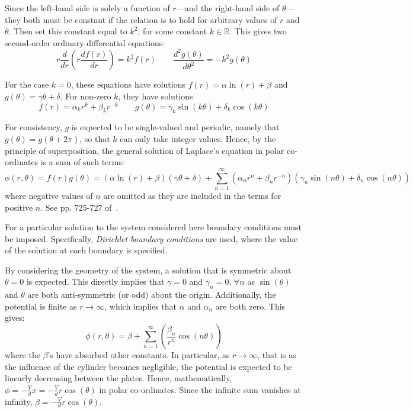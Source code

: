 \documentclass[11pt, a4paper]{article}
\newcommand{\be}{\begin{equation}}
\newcommand{\ee}{\end{equation}}
\begin{document}
Since the left-hand side is solely a function of $r$---and the right-hand side of
$\theta$---they both must be constant if the relation is to hold for arbitrary values
of $r$ and $\theta$. Then set this constant equal to $k^2$, for some constant
$k\in\mathbb{R}$. This gives two second-order ordinary differential equations:
%
\be
r\frac{d}{dr}(r \frac{df(r)}{dr}) = k^2 f(r) \qquad
\frac{d^2 g(\theta)}{d\theta^2}=-k^2 g(\theta)
\ee

For the case $k=0$, these equations have solutions
$f(r)=\alpha \ln(r) + \beta$ and $g(\theta) = \gamma \theta + \delta$.
For non-zero $k$, they have solutions
%
\be
f(r)=\alpha_k r^k + \beta_k r^{-k}
\qquad
g(\theta)= \gamma_k \sin(k\theta)+\delta_k \cos(k\theta)
\ee

For consistency, $g$ is expected to be single-valued and periodic, namely that
$g(\theta)=g(\theta + 2\pi)$, so that $k$ can only take integer values. Hence, by
the principle of superposition, the general solution of Laplace's equation in polar
co-ordinates is a sum of such terms:
%
\be
\phi(r,\theta)
= f(r)g(\theta)
= (\alpha \ln(r) + \beta)(\gamma\theta + \delta) + \sum_{n=1}^{\infty}(\alpha_n r^n+\beta_n r^{-n})(\gamma_n \sin(n\theta) + \delta_n \cos(n\theta))
\ee
%
where negative values of $n$ are omitted as they are included in the terms for positive
$n$. See pp. 725-727 of~\cite{mm}. 

For a particular solution to the system considered here boundary conditions must be
imposed. Specifically, \emph{Dirichlet boundary conditions} are used, where the value
of the solution at each boundary is specified.

By considering the geometry of the system, a solution that is symmetric about $\theta=0$
is expected. This directly implies that $\gamma = 0$ and $\gamma_n=0$, $\forall n$
as $\sin(\theta)$ and $\theta$ are both anti-symmetric (or odd) about the origin.
Additionally, the potential is finite as $r \rightarrow \infty$, which implies that
$\alpha$ and $\alpha_n$ are both zero. This gives:
%
\be
\phi(r,\theta)=\beta + \sum_{n=1}^{\infty}(\frac{\beta_n}{r^n} \cos(n\theta))
\ee
%
where the $\beta$'s have absorbed other constants. In particular, as
$r \rightarrow \infty$, that is as the influence of the cylinder becomes negligible,
the potential is expected to be linearly decreasing between the plates. Hence,
mathematically, $\phi=-\frac{V}{d}x=-\frac{V}{d}r\cos(\theta)$ in polar co-ordinates.
Since the infinite sum vanishes at infinity, $\beta=-\frac{V}{d}r\cos(\theta)$.
\end{document}
